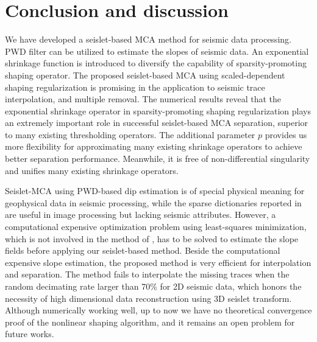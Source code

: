

  

\section{Conclusion and discussion}

We have developed a seislet-based MCA method for seismic data processing. PWD filter can be utilized to estimate the slopes of seismic data. An exponential shrinkage function is introduced to diversify the capability of sparsity-promoting shaping operator. The proposed seislet-based MCA using scaled-dependent shaping regularization is promising in the application to seismic trace interpolation, and multiple removal. The numerical results reveal that the exponential shrinkage operator in sparsity-promoting shaping regularization plays an extremely important role in successful seislet-based MCA separation, superior to many existing thresholding operators. The additional parameter $p$ provides us more flexibility for approximating many existing shrinkage operators to achieve better separation performance. Meanwhile, it is free of non-differential singularity and unifies many existing shrinkage operators. 

Seislet-MCA using PWD-based dip estimation is of special physical meaning for geophysical data in seismic processing, while the sparse dictionaries reported in \cite{starck2004redundant}  are useful in image processing but lacking seismic attributes. However, a computational expensive optimization problem using least-squares minimization, which is not involved in the method of \cite{starck2004redundant}, has to be solved to estimate the slope fields before applying our seislet-based method. Beside the computational expensive slope estimation, the proposed method is very efficient for interpolation and separation. The method fails to interpolate the missing traces when the random decimating rate larger than 70\% for 2D seismic data, which honors the necessity of high dimensional data reconstruction using 3D seislet transform. Although numerically working well, up to now we have no theoretical convergence proof of the nonlinear shaping algorithm, and it remains an open problem for future works.

